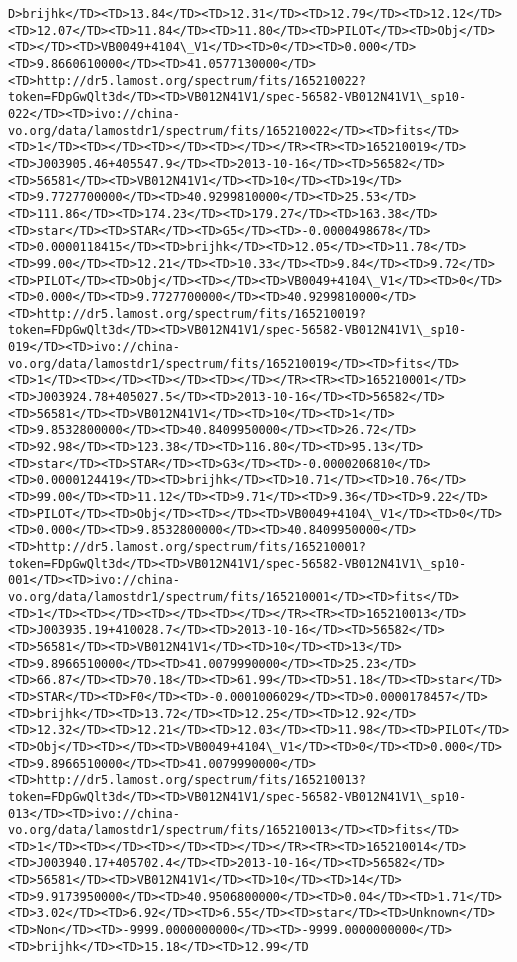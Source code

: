\documentclass[11pt]{article}
\begin{document}
\begin{Verbatim}[commandchars=\\\{\}]
D>brijhk</TD><TD>13.84</TD><TD>12.31</TD><TD>12.79</TD><TD>12.12</TD><TD>12.07</TD><TD>11.84</TD><TD>11.80</TD><TD>PILOT</TD><TD>Obj</TD><TD></TD><TD>VB0049+4104\_V1</TD><TD>0</TD><TD>0.000</TD><TD>9.8660610000</TD><TD>41.0577130000</TD><TD>http://dr5.lamost.org/spectrum/fits/165210022?token=FDpGwQlt3d</TD><TD>VB012N41V1/spec-56582-VB012N41V1\_sp10-022</TD><TD>ivo://china-vo.org/data/lamostdr1/spectrum/fits/165210022</TD><TD>fits</TD><TD>1</TD><TD></TD><TD></TD><TD></TD></TR><TR><TD>165210019</TD><TD>J003905.46+405547.9</TD><TD>2013-10-16</TD><TD>56582</TD><TD>56581</TD><TD>VB012N41V1</TD><TD>10</TD><TD>19</TD><TD>9.7727700000</TD><TD>40.9299810000</TD><TD>25.53</TD><TD>111.86</TD><TD>174.23</TD><TD>179.27</TD><TD>163.38</TD><TD>star</TD><TD>STAR</TD><TD>G5</TD><TD>-0.0000498678</TD><TD>0.0000118415</TD><TD>brijhk</TD><TD>12.05</TD><TD>11.78</TD><TD>99.00</TD><TD>12.21</TD><TD>10.33</TD><TD>9.84</TD><TD>9.72</TD><TD>PILOT</TD><TD>Obj</TD><TD></TD><TD>VB0049+4104\_V1</TD><TD>0</TD><TD>0.000</TD><TD>9.7727700000</TD><TD>40.9299810000</TD><TD>http://dr5.lamost.org/spectrum/fits/165210019?token=FDpGwQlt3d</TD><TD>VB012N41V1/spec-56582-VB012N41V1\_sp10-019</TD><TD>ivo://china-vo.org/data/lamostdr1/spectrum/fits/165210019</TD><TD>fits</TD><TD>1</TD><TD></TD><TD></TD><TD></TD></TR><TR><TD>165210001</TD><TD>J003924.78+405027.5</TD><TD>2013-10-16</TD><TD>56582</TD><TD>56581</TD><TD>VB012N41V1</TD><TD>10</TD><TD>1</TD><TD>9.8532800000</TD><TD>40.8409950000</TD><TD>26.72</TD><TD>92.98</TD><TD>123.38</TD><TD>116.80</TD><TD>95.13</TD><TD>star</TD><TD>STAR</TD><TD>G3</TD><TD>-0.0000206810</TD><TD>0.0000124419</TD><TD>brijhk</TD><TD>10.71</TD><TD>10.76</TD><TD>99.00</TD><TD>11.12</TD><TD>9.71</TD><TD>9.36</TD><TD>9.22</TD><TD>PILOT</TD><TD>Obj</TD><TD></TD><TD>VB0049+4104\_V1</TD><TD>0</TD><TD>0.000</TD><TD>9.8532800000</TD><TD>40.8409950000</TD><TD>http://dr5.lamost.org/spectrum/fits/165210001?token=FDpGwQlt3d</TD><TD>VB012N41V1/spec-56582-VB012N41V1\_sp10-001</TD><TD>ivo://china-vo.org/data/lamostdr1/spectrum/fits/165210001</TD><TD>fits</TD><TD>1</TD><TD></TD><TD></TD><TD></TD></TR><TR><TD>165210013</TD><TD>J003935.19+410028.7</TD><TD>2013-10-16</TD><TD>56582</TD><TD>56581</TD><TD>VB012N41V1</TD><TD>10</TD><TD>13</TD><TD>9.8966510000</TD><TD>41.0079990000</TD><TD>25.23</TD><TD>66.87</TD><TD>70.18</TD><TD>61.99</TD><TD>51.18</TD><TD>star</TD><TD>STAR</TD><TD>F0</TD><TD>-0.0001006029</TD><TD>0.0000178457</TD><TD>brijhk</TD><TD>13.72</TD><TD>12.25</TD><TD>12.92</TD><TD>12.32</TD><TD>12.21</TD><TD>12.03</TD><TD>11.98</TD><TD>PILOT</TD><TD>Obj</TD><TD></TD><TD>VB0049+4104\_V1</TD><TD>0</TD><TD>0.000</TD><TD>9.8966510000</TD><TD>41.0079990000</TD><TD>http://dr5.lamost.org/spectrum/fits/165210013?token=FDpGwQlt3d</TD><TD>VB012N41V1/spec-56582-VB012N41V1\_sp10-013</TD><TD>ivo://china-vo.org/data/lamostdr1/spectrum/fits/165210013</TD><TD>fits</TD><TD>1</TD><TD></TD><TD></TD><TD></TD></TR><TR><TD>165210014</TD><TD>J003940.17+405702.4</TD><TD>2013-10-16</TD><TD>56582</TD><TD>56581</TD><TD>VB012N41V1</TD><TD>10</TD><TD>14</TD><TD>9.9173950000</TD><TD>40.9506800000</TD><TD>0.04</TD><TD>1.71</TD><TD>3.02</TD><TD>6.92</TD><TD>6.55</TD><TD>star</TD><TD>Unknown</TD><TD>Non</TD><TD>-9999.0000000000</TD><TD>-9999.0000000000</TD><TD>brijhk</TD><TD>15.18</TD><TD>12.99</TD
\end{Verbatim}
\end{document}
